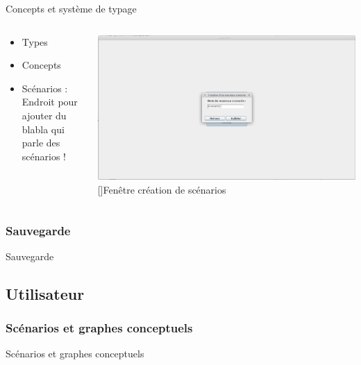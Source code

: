 \documentclass[8pt]{beamer}
\begin{document}
\begin{frame}{Concepts et système de typage}
\begin{columns}

\begin{column}{6cm}
\begin{itemize}
\item Types
\item Concepts
\item Scénarios :
\\ Endroit pour ajouter du blabla qui parle des scénarios !
\end{itemize}
\end{column}


\begin{column}{6cm}
\includegraphics[scale=0.135]{creation_scenario.png}
[]{Fenêtre création de scénarios}
\end{column}

\end{columns}
\end{frame}

\subsubsection{Sauvegarde}
\begin{frame}{Sauvegarde}
\end{frame}


\subsection{Utilisateur}

\subsubsection{Scénarios et graphes conceptuels}
\begin{frame}{Scénarios et graphes conceptuels}
\end{frame}
\end{document}
